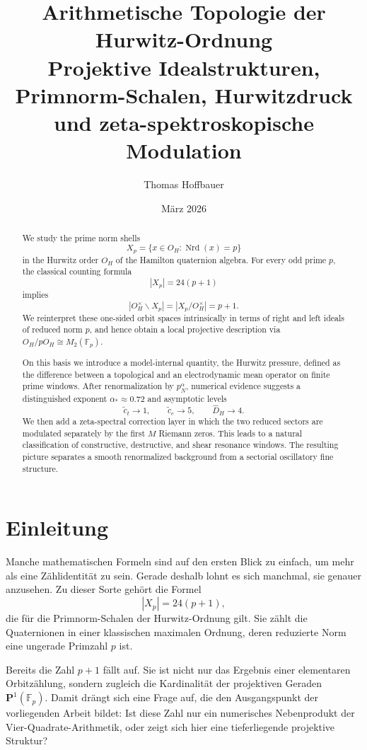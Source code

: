 \documentclass[a4paper,12pt]{article}
\title{\textbf{Arithmetische Topologie der Hurwitz-Ordnung}\\[0.4em]
	\large Projektive Idealstrukturen, Primnorm-Schalen, Hurwitzdruck\\
	und zeta-spektroskopische Modulation}
\author{Thomas Hoffbauer}
\date{März 2026}
\theoremstyle{definition}
\numberwithin{equation}{section}
\newcommand{\Fp}{\mathbb{F}_p}
\begin{document}
	\maketitle
	
	\begin{abstract}
		We study the prime norm shells
		\[
		X_p=\{x\in O_H:\operatorname{Nrd}(x)=p\}
		\]
		in the Hurwitz order \(O_H\) of the Hamilton quaternion algebra. For every odd prime \(p\), the classical counting formula
		\[
		|X_p|=24(p+1)
		\]
		implies
		\[
		|O_H^\times\backslash X_p|=|X_p/O_H^\times|=p+1.
		\]
		We reinterpret these one-sided orbit spaces intrinsically in terms of right and left ideals of reduced norm \(p\), and hence obtain a local projective description via \(O_H/pO_H\cong M_2(\mathbb F_p)\).
		
		On this basis we introduce a model-internal quantity, the Hurwitz pressure, defined as the difference between a topological and an electrodynamic mean operator on finite prime windows. After renormalization by \(p_N^\alpha\), numerical evidence suggests a distinguished exponent \(\alpha_\ast\approx 0.72\) and asymptotic levels
		\[
		\tilde c_t\to 1,\qquad \tilde c_e\to 5,\qquad \widehat D_H\to 4.
		\]
		We then add a zeta-spectral correction layer in which the two reduced sectors are modulated separately by the first \(M\) Riemann zeros. This leads to a natural classification of constructive, destructive, and shear resonance windows. The resulting picture separates a smooth renormalized background from a sectorial oscillatory fine structure.
	\end{abstract}
	
	\tableofcontents
	\newpage
	
	\section{Einleitung}
	
	Manche mathematischen Formeln sind auf den ersten Blick zu einfach, um mehr als eine Zählidentität zu sein. Gerade deshalb lohnt es sich manchmal, sie genauer anzusehen. Zu dieser Sorte gehört die Formel
	\[
	|X_p|=24(p+1),
	\]
	die für die Primnorm-Schalen der Hurwitz-Ordnung gilt. Sie zählt die Quaternionen in einer klassischen maximalen Ordnung, deren reduzierte Norm eine ungerade Primzahl \(p\) ist.
	
	Bereits die Zahl \(p+1\) fällt auf. Sie ist nicht nur das Ergebnis einer elementaren Orbitzählung, sondern zugleich die Kardinalität der projektiven Geraden \(\mathbf P^1(\Fp)\). Damit drängt sich eine Frage auf, die den Ausgangspunkt der vorliegenden Arbeit bildet: Ist diese Zahl nur ein numerisches Nebenprodukt der Vier-Quadrate-Arithmetik, oder zeigt sich hier eine tieferliegende projektive Struktur?
	
\end{document}
